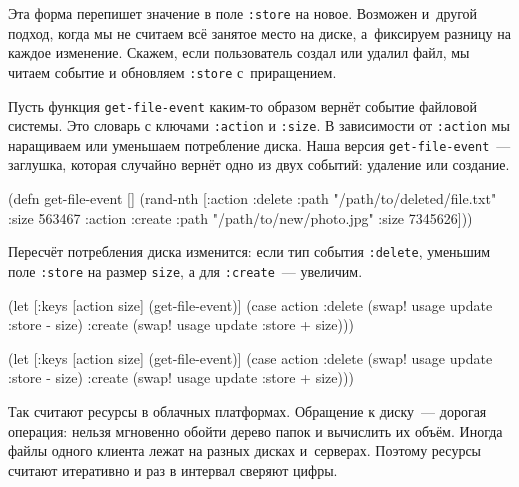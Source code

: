 Эта форма перепишет значение в поле \verb|:store| на новое. Возможен и~другой
подход, когда мы не считаем всё занятое место на диске, а~фиксируем разницу на
каждое изменение. Скажем, если пользователь создал или удалил файл, мы читаем
событие и обновляем \verb|:store| с~приращением.

Пусть функция \verb|get-file-event| каким-то образом вернёт событие файловой
системы. Это словарь с ключами \verb|:action| и \verb|:size|. В зависимости от
\verb|:action| мы наращиваем или уменьшаем потребление диска. Наша версия
\texttt{get-file\--event}~--- заглушка, которая случайно вернёт одно из двух
событий: удаление или создание.

\begin{english}
  \begin{clojure}
(defn get-file-event []
  (rand-nth
   [{:action :delete
     :path "/path/to/deleted/file.txt"
     :size 563467}
    {:action :create
     :path "/path/to/new/photo.jpg"
     :size 7345626}]))
  \end{clojure}
\end{english}

Пересчёт потребления диска изменится: если тип события \verb|:delete|, уменьшим
поле \verb|:store| на размер \verb|size|, а для \verb|:create|~--- увеличим.

\ifnarrow

\begin{english}
  \begin{clojure}
(let [{:keys [action size]}
      (get-file-event)]
  (case action
    :delete
    (swap! usage update :store - size)
    :create
    (swap! usage update :store + size)))
  \end{clojure}
\end{english}

\else

\begin{english}
  \begin{clojure}
(let [{:keys [action size]} (get-file-event)]
  (case action
    :delete
    (swap! usage update :store - size)
    :create
    (swap! usage update :store + size)))
  \end{clojure}
\end{english}

\fi


Так считают ресурсы в облачных платформах. Обращение к диску~--- дорогая
операция: нельзя мгновенно обойти дерево папок и вычислить их объём. Иногда
файлы одного клиента лежат на разных дисках и~серверах. Поэтому ресурсы считают
итеративно и раз в интервал сверяют цифры.

